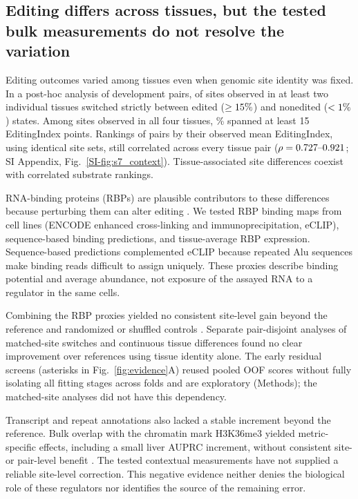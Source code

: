 \documentclass[9pt,twocolumn,twoside]{pnas-new}
\newcommand{\SIref}[1]{\ref*{SI-#1}}
\begin{document}
\subsection*{Editing differs across tissues, but the tested bulk measurements do not resolve the variation}

Editing outcomes varied among tissues even when genomic site identity was fixed. In a post-hoc analysis of development pairs, \NStrictSwitchSites{} of \NMatchedSitesTwoTissues{} sites observed in at least two individual tissues switched strictly between edited ($\geq15{}\%$) and nonedited ($<1{}\%$) states. Among \NMatchedSitesFourTissues{} sites observed in all four tissues, \AllFourRangeFifteenPct{}\% spanned at least 15 EditingIndex points. Rankings of pairs by their observed mean EditingIndex, using identical site sets, still correlated across every tissue pair ($\rho=0.727{}\text{--}0.921{}$; SI Appendix, Fig.~\SIref{fig:s7_context}). Tissue-associated site differences coexist with correlated substrate rankings.

RNA-binding proteins (RBPs) are plausible contributors to these differences because perturbing them can alter editing \cite{Freund2020,QuinonesValdez2019,Park2026,Yi2026}. We tested RBP binding maps from cell lines (ENCODE enhanced cross-linking and immunoprecipitation, eCLIP), sequence-based binding predictions, and tissue-average RBP expression. Sequence-based predictions complemented eCLIP because repeated Alu sequences make binding reads difficult to assign uniquely. These proxies describe binding potential and average abundance, not exposure of the assayed RNA to a regulator in the same cells.

Combining the RBP proxies yielded no consistent site-level gain beyond the reference and randomized or shuffled controls \cite{VanNostrand2020,Sun2021PrismNet,Horlacher2023RBPNet,GTEx2020}. Separate pair-disjoint analyses of matched-site switches and continuous tissue differences found no clear improvement over references using tissue identity alone. The early residual screens (asterisks in Fig.~\ref{fig:evidence}A) reused pooled OOF scores without fully isolating all fitting stages across folds and are exploratory (Methods); the matched-site analyses did not have this dependency.

Transcript and repeat annotations also lacked a stable increment beyond the reference. Bulk overlap with the chromatin mark H3K36me3 yielded metric-specific effects, including a small liver AUPRC increment, without consistent site- or pair-level benefit \cite{Cai2026,ENCODE2020}. The tested contextual measurements have not supplied a reliable site-level correction. This negative evidence neither denies the biological role of these regulators nor identifies the source of the remaining error.
\end{document}
